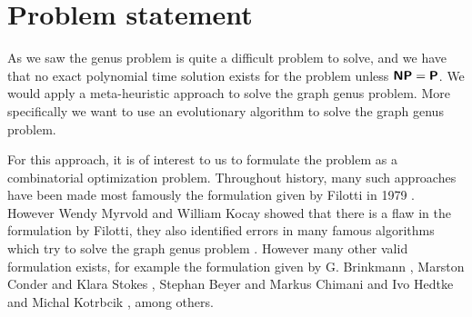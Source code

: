 \documentclass{article}
\newcommand{\classX}[1]{\ensuremath{\text{\textsf{\textbf{#1}}}}}
\newcommand{\classP}{\classX{P}}
\newcommand{\classNP}{\classX{NP}}
\begin{document}
\section{Problem statement}\label{sec3}
    As we saw the genus problem is quite a difficult problem to solve, and we have that no exact polynomial time solution exists for the problem unless $\classNP = \classP$.
    We would apply a meta-heuristic approach to solve the graph genus problem. More specifically we want to use an evolutionary algorithm to solve the graph genus problem.
    
    For this approach, it is of interest to us to formulate the problem as a combinatorial optimization problem. 
    Throughout history, many such approaches have been made most famously the formulation given by Filotti in 1979 \cite{Filotti79}. However Wendy Myrvold and William Kocay showed that there is a flaw in the formulation by Filotti, they also identified errors in many famous algorithms which try to solve the graph genus problem \cite{Myrvold11}.
    However many other valid formulation exists, for example the formulation given by G. Brinkmann \cite{brinkmann20}, Marston Conder and Klara Stokes \cite{Conder19}, Stephan Beyer and Markus Chimani and Ivo Hedtke and Michal Kotrbcik \cite{Beyer16}, among others.
    
\end{document}
